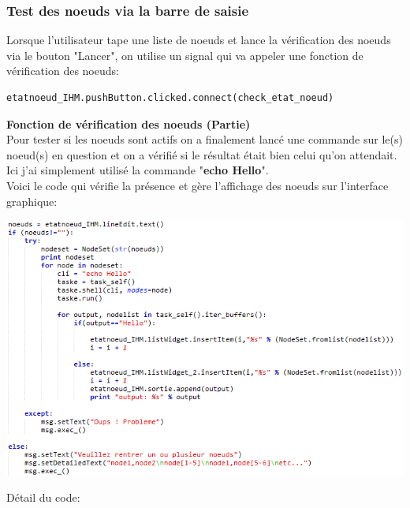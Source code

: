 \documentclass[a4paper,11pt]{article}
\begin{document}
\subsubsection{Test des noeuds via la barre de saisie}
Lorsque l'utilisateur tape une liste de noeuds et lance la vérification des noeuds via le bouton "Lancer", on utilise un signal qui va appeler une fonction de vérification des noeuds:\\
\begin{lstlisting}
etatnoeud_IHM.pushButton.clicked.connect(check_etat_noeud)
\end{lstlisting}
\textbf{Fonction de vérification des noeuds (Partie)}\\
Pour tester si les noeuds sont actifs on a finalement lancé une commande sur le(s) noeud(s) en question et on a vérifié si le résultat était bien celui qu'on attendait. Ici j'ai simplement utilisé la commande "\textbf{echo Hello}".\\
Voici le code qui vérifie la présence et gère l'affichage des noeuds sur l'interface graphique:
\begin{flushleft}
\includegraphics[scale=1]{check_etatnoeud.png} 
\end{flushleft}
Détail du code:\\
\end{document}
